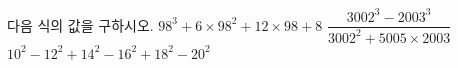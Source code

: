 다음 식의 값을 구하시오.
 $98^3+6\times 98^2+12\times 98+8$
 $\dfrac{3002^3-2003^3}{3002^2+5005\times 2003}$
 $10^2-12^2+14^2-16^2+18^2-20^2$

